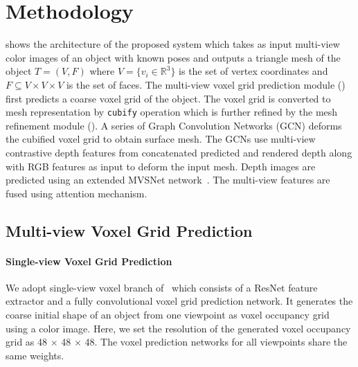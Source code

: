 \section{Methodology}

 shows the architecture of the proposed system which takes as input multi-view color images of an object with known poses and outputs a triangle mesh of the object $ T = (V, F) $ where $ V = \{ v_i \in \mathbb{R}^3\} $ is the set of vertex coordinates and $ F \subseteq V \times V \times V $ is the set of faces.
The multi-view voxel grid prediction module () first predicts a coarse voxel grid of the object.
The voxel grid is converted to mesh representation by \texttt{cubify} operation which is further refined by the mesh refinement module ().
A series of Graph Convolution Networks (GCN) deforms the cubified voxel grid to obtain surface mesh.
The GCNs use multi-view contrastive depth features from concatenated predicted and rendered depth along with RGB features as input to deform the input mesh.
Depth images are predicted using an extended MVSNet network~\cite{yao2018mvsnet}.
The multi-view features are fused using attention mechanism.


\subsection{Multi-view Voxel Grid Prediction}
\label{subsec:multiview_voxel}

\paragraph{Single-view Voxel Grid Prediction}
We adopt single-view voxel branch of~\cite{gkioxari2019meshrcnn} which consists of a ResNet feature extractor and a fully convolutional voxel grid prediction network. It generates the coarse initial shape of an object from one viewpoint as voxel occupancy grid using a color image. Here, we set the resolution of the generated voxel occupancy grid as 48 $\times$ 48 $\times$ 48. The voxel prediction networks for all viewpoints share the same weights.

